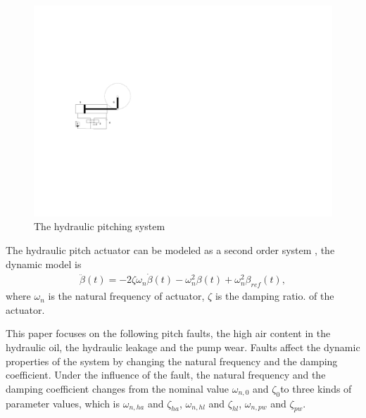\documentclass{article}
\begin{document}
\begin{figure}[!htb]
  \centering
  \includegraphics[]{fig2.pdf}
  \caption{The hydraulic pitching system}
  \label{fig:2}
\end{figure}

The hydraulic pitch actuator can be modeled as a second order system \cite{ref:15},
the dynamic model is
\begin{eqnarray}
  \ddot{\beta}(t) = -2\zeta\omega_n\dot{\beta}(t) - \omega^2_n\beta(t) + \omega^2_n\beta_{ref}(t),
\end{eqnarray}
where $\omega_n$ is the natural frequency of actuator, $\zeta$ is the damping ratio.
of the actuator.

This paper focuses on the following pitch faults,
the high air content in the hydraulic oil, the hydraulic leakage and the pump wear.
Faults affect the dynamic properties of the system by changing the  natural frequency and
the damping coefficient.
Under the influence of the fault, the natural frequency and the damping coefficient
changes from the nominal value $\omega_{n,0}$ and $\zeta_0$to three kinds of parameter values,
which is $\omega_{n,ha}$ and $\zeta_{ha}$, $\omega_{n,hl}$ and $\zeta_{hl}$, $\omega_{n,pw}$ and $\zeta_{pw}$.
\end{document}
